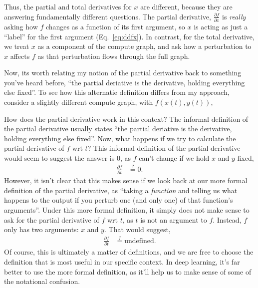 \documentclass{article}
\newcommand{\dd}[2][]{\frac{\partial #1}{\partial #2}}
\begin{document}
Thus, the partial and total derivatives for $x$ are different, because they are answering fundamentally different questions.
The partial derivative, $\dd[f]{x}$ is \textit{really} asking how $f$ changes as a function of its first argument, so $x$ is acting as just a ``label'' for the first argument (Eq.~\ref{eq:ddfx}).
In contrast, for the total derivative, we treat $x$ as a component of the compute graph, and ask how a perturbation to $x$ affects $f$ as that perturbation flows through the full graph.

Now, its worth relating my notion of the partial derivative back to something you've heard before, ``the partial deriative is the derivative, holding everything else fixed''.
To see how this alternatie definition differs from my approach, consider a slightly different compute graph, with $f(x(t), y(t))$,
\begin{center}
\end{center}
How does the partial derivative work in this context?
The informal definition of the partial derivative usually states ``the partial deriative is the derivative, holding everything else fixed''.
Now, what happens if we try to calculate the partial derivative of $f$ wrt $t$?
This informal definition of the partial derivative would seem to suggest the answer is $0$, as $f$ can't change if we hold $x$ and $y$ fixed,
\begin{align}
  \dd[f]{t} &\stackrel{?}{=} 0.
\end{align}
However, it isn't clear that this makes sense if we look back at our more formal definition of the partial derivative, as ``taking a \textit{function} and telling us what happens to the output if you perturb one (and only one) of that function's arguments''.
Under this more formal definition, it simply does not make sense to ask for the partial derivative of $f$ wrt $t$, as $t$ is not an argument to $f$.  
Instead, $f$ only has two arguments: $x$ and $y$.  
That would suggest,
\begin{align}
  \dd[f]{t} &\stackrel{?}{=} \text{undefined}.
\end{align}
Of course, this is ultimately a matter of definitions, and we are free to choose the definition that is most useful in our specific context.
In deep learning, it's far better to use the more formal definition, as it'll help us to make sense of some of the notational confusion.
\end{document}
